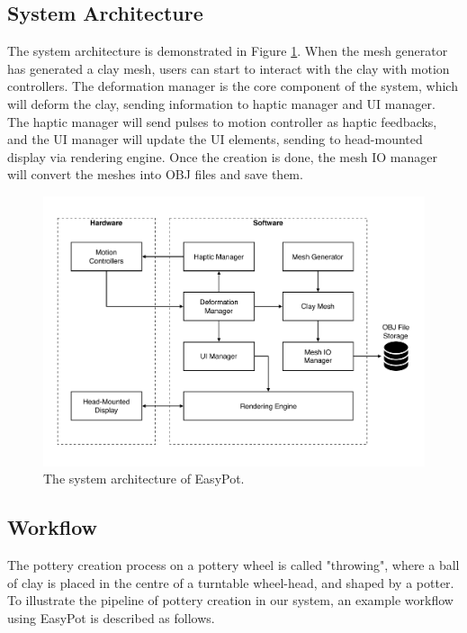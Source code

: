 \documentclass{svjour3}                     %
\begin{document}
\subsection{System Architecture}
\label{sec:3.1}

The system architecture is demonstrated in Figure \ref{fig:arc}. When the mesh generator has generated a clay mesh, users can start to interact with the clay with motion controllers. The deformation manager is the core component of the system, which will deform the clay, sending information to haptic manager and UI manager. The haptic manager will send pulses to motion controller as haptic feedbacks, and the UI manager will update the UI elements, sending to head-mounted display via rendering engine. Once the creation is done, the mesh IO manager will convert the meshes into OBJ files and save them.

\begin{figure}
\includegraphics[width=\textwidth]{arc.pdf}
\caption{The system architecture of EasyPot.}
\label{fig:arc}
\end{figure}



\subsection{Workflow}
\label{sec:3.2}
The pottery creation process on a pottery wheel is called "throwing", where a ball of clay is placed in the centre of a turntable wheel-head, and shaped by a potter.
To illustrate the pipeline of pottery creation in our system, an example workflow using EasyPot is described as follows.
\end{document}
